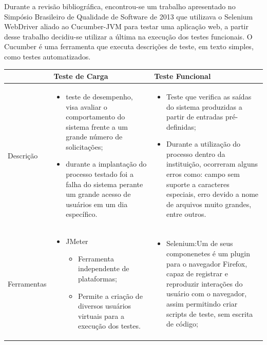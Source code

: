 \documentclass[12pt]{article}
\begin{document}
Durante a revisão bibliográfica, encontrou-se um trabalho apresentado no Simpósio Brasileiro de Qualidade de Software de 2013 \cite{sbqs2013} que utilizava o Selenium WebDriver aliado ao Cucumber-JVM \cite{CUCUMBER} para testar uma aplicação web, a partir desse trabalho decidiu-se utilizar a última na execução dos testes funcionais. O Cucumber é uma ferramenta que executa descrições de teste, em texto simples, como testes automatizados.



\begin{table}
{\scriptsize
\centering
\begin{tabular}{|p{2cm}|p{6cm}|p{6cm}|}
  & Teste de Carga & Teste Funcional  \\\hline
Descrição & 
\begin{itemize}
\item{teste de desempenho, visa avaliar o comportamento do sistema frente a um grande número de solicitações;}
\item{durante a implantação do processo testado foi a falha do sistema perante um grande acesso de usuários em um dia específico.}
\end{itemize}
&
\begin{itemize}
\item{Teste que verifica as saídas do sistema produzidas a
partir de entradas pré-definidas;}
\item{Durante a utilização do processo
dentro da instituição, ocorreram alguns erros como: campo sem suporte a caracteres especiais,
erro devido a nome de arquivos muito grandes, entre outros.}
\end{itemize}
 \\\hline
Ferramentas &
\begin{itemize}
 \item{JMeter}
 \begin{itemize}
  \item{Ferramenta independente de plataformas;}
  \item{Permite a criação de diversos usuários virtuais  para a execução dos testes.}
  \end{itemize}
\end{itemize}
 & 
\begin{itemize}
\item{Selenium:Um de seus componenetes é um plugin para o navegador Firefox, capaz de registrar e reproduzir interações do usuário com o navegador, assim permitindo criar scripts de teste, sem escrita de código;}

\end{itemize}
\end{tabular}}
\end{table}
\end{document}
